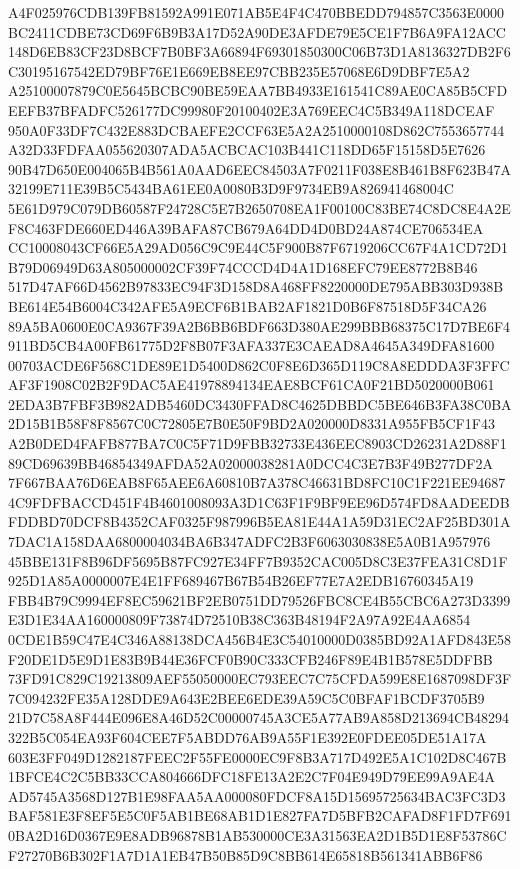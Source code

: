 \documentclass[UTF8,fontset=fandol,zihao=-4,a4paper]{ctexart}
\begin{document}
{{A4F025976CDB139FB81592A991E071AB5E4F4C470BBEDD794857C3563E0000BC2411CDBE73CD69F6B9B3A17D52A90DE3AFDE79E5CE1F7B6A9FA12ACC
148D6EB83CF23D8BCF7B0BF3A66894F69301850300C06B73D1A8136327DB2F6C30195167542ED79BF76E1E669EB8EE97CBB235E57068E6D9DBF7E5A2
A25100007879C0E5645BCBC90BE59EAA7BB4933E161541C89AE0CA85B5CFDEEFB37BFADFC526177DC99980F20100402E3A769EEC4C5B349A118DCEAF
950A0F33DF7C432E883DCBAEFE2CCF63E5A2A2510000108D862C7553657744A32D33FDFAA055620307ADA5ACBCAC103B441C118DD65F15158D5E7626
90B47D650E004065B4B561A0AAD6EEC84503A7F0211F038E8B461B8F623B47A32199E711E39B5C5434BA61EE0A0080B3D9F9734EB9A826941468004C
5E61D979C079DB60587F24728C5E7B2650708EA1F00100C83BE74C8DC8E4A2EF8C463FDE660ED446A39BAFA87CB679A64DD4D0BD24A874CE706534EA
CC10008043CF66E5A29AD056C9C9E44C5F900B87F6719206CC67F4A1CD72D1B79D06949D63A805000002CF39F74CCCD4D4A1D168EFC79EE8772B8B46
517D47AF66D4562B97833EC94F3D158D8A468FF8220000DE795ABB303D938BBE614E54B6004C342AFE5A9ECF6B1BAB2AF1821D0B6F87518D5F34CA26
89A5BA0600E0CA9367F39A2B6BB6BDF663D380AE299BBB68375C17D7BE6F4911BD5CB4A00FB61775D2F8B07F3AFA337E3CAEAD8A4645A349DFA81600
00703ACDE6F568C1DE89E1D5400D862C0F8E6D365D119C8A8EDDDA3F3FFCAF3F1908C02B2F9DAC5AE41978894134EAE8BCF61CA0F21BD5020000B061
2EDA3B7FBF3B982ADB5460DC3430FFAD8C4625DBBDC5BE646B3FA38C0BA2D15B1B58F8F8567C0C72805E7B0E50F9BD2A020000D8331A955FB5CF1F43
A2B0DED4FAFB877BA7C0C5F71D9FBB32733E436EEC8903CD26231A2D88F189CD69639BB46854349AFDA52A02000038281A0DCC4C3E7B3F49B277DF2A
7F667BAA76D6EAB8F65AEE6A60810B7A378C46631BD8FC10C1F221EE946874C9FDFBACCD451F4B4601008093A3D1C63F1F9BF9EE96D574FD8AADEEDB
FDDBD70DCF8B4352CAF0325F987996B5EA81E44A1A59D31EC2AF25BD301A7DAC1A158DAA6800004034BA6B347ADFC2B3F6063030838E5A0B1A957976
45BBE131F8B96DF5695B87FC927E34FF7B9352CAC005D8C3E37FEA31C8D1F925D1A85A0000007E4E1FF689467B67B54B26EF77E7A2EDB16760345A19
FBB4B79C9994EF8EC59621BF2EB0751DD79526FBC8CE4B55CBC6A273D3399E3D1E34AA160000809F73874D72510B38C363B48194F2A97A92E4AA6854
0CDE1B59C47E4C346A88138DCA456B4E3C54010000D0385BD92A1AFD843E58F20DE1D5E9D1E83B9B44E36FCF0B90C333CFB246F89E4B1B578E5DDFBB
73FD91C829C19213809AEF55050000EC793EEC7C75CFDA599E8E1687098DF3F7C094232FE35A128DDE9A643E2BEE6EDE39A59C5C0BFAF1BCDF3705B9
21D7C58A8F444E096E8A46D52C00000745A3CE5A77AB9A858D213694CB48294322B5C054EA93F604CEE7F5ABDD76AB9A55F1E392E0FDEE05DE51A17A
603E3FF049D1282187FEEC2F55FE0000EC9F8B3A717D492E5A1C102D8C467B1BFCE4C2C5BB33CCA804666DFC18FE13A2E2C7F04E949D79EE99A9AE4A
AD5745A3568D127B1E98FAA5AA000080FDCF8A15D15695725634BAC3FC3D3BAF581E3F8EF5E5C0F5AB1BE68AB1D1E827FA7D5BFB2CAFAD8F1FD7F691
0BA2D16D0367E9E8ADB96878B1AB530000CE3A31563EA2D1B5D1E8F53786CF27270B6B302F1A7D1A1EB47B50B85D9C8BB614E65818B561341ABB6F86
}}
\end{document}
